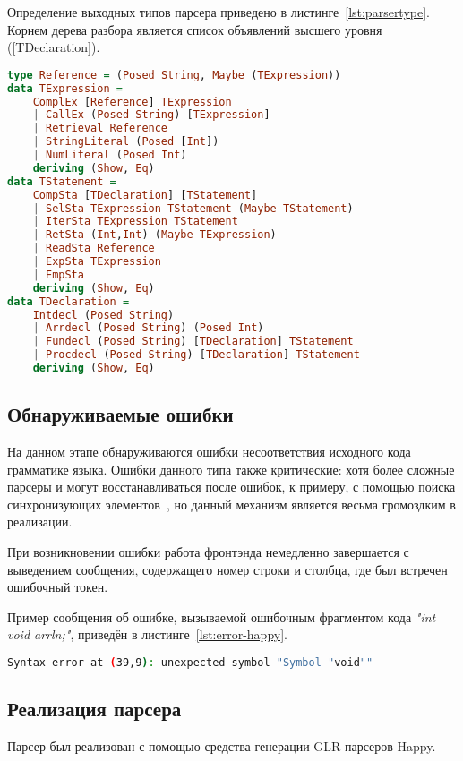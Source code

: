 \documentclass[a4paper,12pt]{report}
\numberwithin{equation}{section}
\begin{document}
Определение выходных типов парсера приведено в листинге~\ref{lst:parsertype}.
Корнем дерева разбора является список объявлений высшего уровня ([TDeclaration]).

\begin{lstlisting}[language=haskell,caption={Выходные типы данных парсера},label=lst:parsertype]
type Reference = (Posed String, Maybe (TExpression))
data TExpression =
    ComplEx [Reference] TExpression
    | CallEx (Posed String) [TExpression]
    | Retrieval Reference
    | StringLiteral (Posed [Int])
    | NumLiteral (Posed Int)
    deriving (Show, Eq)
data TStatement =
    CompSta [TDeclaration] [TStatement]
    | SelSta TExpression TStatement (Maybe TStatement)
    | IterSta TExpression TStatement
    | RetSta (Int,Int) (Maybe TExpression)
    | ReadSta Reference
    | ExpSta TExpression
    | EmpSta
    deriving (Show, Eq)
data TDeclaration =
    Intdecl (Posed String)
    | Arrdecl (Posed String) (Posed Int)
    | Fundecl (Posed String) [TDeclaration] TStatement
    | Procdecl (Posed String) [TDeclaration] TStatement
    deriving (Show, Eq)
\end{lstlisting}

\subsection{Обнаруживаемые ошибки}
На данном этапе обнаруживаются ошибки несоответствия исходного кода грамматике языка.
Ошибки данного типа также критические: хотя более сложные парсеры и могут восстанавливаться после ошибок, к примеру, с помощью поиска синхронизующих элементов~\cite{wikiparseerror}, но данный механизм является весьма громоздким в реализации.

При возникновении ошибки работа фронтэнда немедленно завершается с выведением сообщения, содержащего номер строки и столбца, где был встречен ошибочный токен.

Пример сообщения об ошибке, вызываемой ошибочным фрагментом кода \textit{"int void arrln;"}, приведён в листинге~\ref{lst:error-happy}.

\begin{lstlisting}[language=bash,caption={Сообщение о синтаксической ошибке},label=lst:error-happy]
Syntax error at (39,9): unexpected symbol "Symbol "void""
\end{lstlisting}

\subsection{Реализация парсера}
Парсер был реализован с помощью средства генерации GLR-парсеров Happy.
\end{document}
